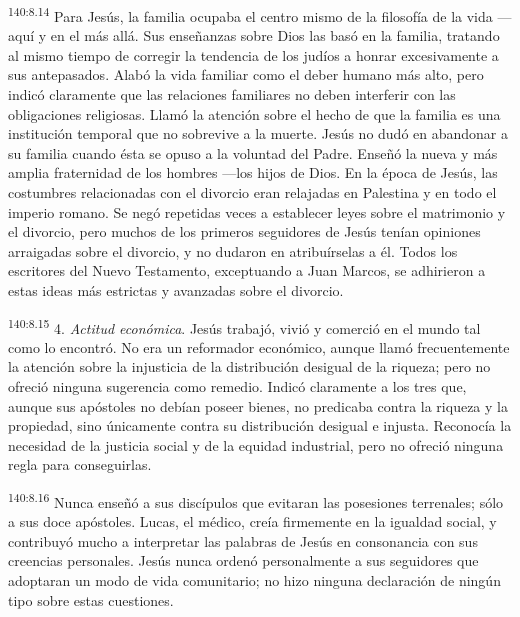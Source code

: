\par 
\textsuperscript{140:8.14} Para Jesús, la familia ocupaba el centro mismo de la filosofía de la vida ---aquí y en el más allá. Sus enseñanzas sobre Dios las basó en la familia, tratando al mismo tiempo de corregir la tendencia de los judíos a honrar excesivamente a sus antepasados. Alabó la vida familiar como el deber humano más alto, pero indicó claramente que las relaciones familiares no deben interferir con las obligaciones religiosas. Llamó la atención sobre el hecho de que la familia es una institución temporal que no sobrevive a la muerte. Jesús no dudó en abandonar a su familia cuando ésta se opuso a la voluntad del Padre. Enseñó la nueva y más amplia fraternidad de los hombres ---los hijos de Dios. En la época de Jesús, las costumbres relacionadas con el divorcio eran relajadas en Palestina y en todo el imperio romano. Se negó repetidas veces a establecer leyes sobre el matrimonio y el divorcio, pero muchos de los primeros seguidores de Jesús tenían opiniones arraigadas sobre el divorcio, y no dudaron en atribuírselas a él. Todos los escritores del Nuevo Testamento, exceptuando a Juan Marcos, se adhirieron a estas ideas más estrictas y avanzadas sobre el divorcio.

\par 
\textsuperscript{140:8.15} 4. \textit{Actitud económica}. Jesús trabajó, vivió y comerció en el mundo tal como lo encontró. No era un reformador económico, aunque llamó frecuentemente la atención sobre la injusticia de la distribución desigual de la riqueza; pero no ofreció ninguna sugerencia como remedio. Indicó claramente a los tres que, aunque sus apóstoles no debían poseer bienes, no predicaba contra la riqueza y la propiedad, sino únicamente contra su distribución desigual e injusta. Reconocía la necesidad de la justicia social y de la equidad industrial, pero no ofreció ninguna regla para conseguirlas.

\par 
\textsuperscript{140:8.16} Nunca enseñó a sus discípulos que evitaran las posesiones terrenales; sólo a sus doce apóstoles. Lucas, el médico, creía firmemente en la igualdad social, y contribuyó mucho a interpretar las palabras de Jesús en consonancia con sus creencias personales. Jesús nunca ordenó personalmente a sus seguidores que adoptaran un modo de vida comunitario; no hizo ninguna declaración de ningún tipo sobre estas cuestiones.

